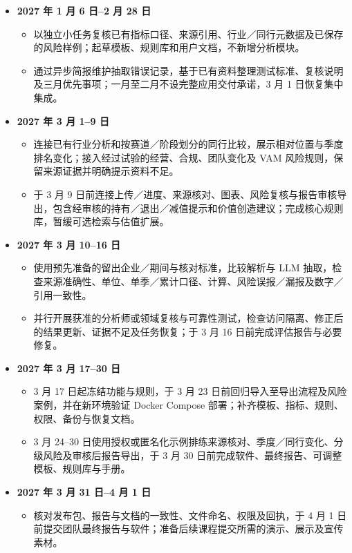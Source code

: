\documentclass[a4paper,12pt]{article}
\begin{document}
\begin{itemize}
  \item \textbf{2027 年 1 月 6 日--2 月 28 日}
    \begin{itemize}
      \item 以独立小任务复核已有指标口径、来源引用、行业／同行元数据及已保存的风险样例；起草模板、规则库和用户文档，不新增分析模块。
      \item 通过异步简报维护抽取错误记录，基于已有资料整理测试标准、复核说明及三月优先事项；一月至二月不设完整应用交付承诺，3 月 1 日恢复集中集成。
    \end{itemize}

  \item \textbf{2027 年 3 月 1--9 日}
    \begin{itemize}
      \item 连接已有行业分析和按赛道／阶段划分的同行比较，展示相对位置与季度排名变化；接入经过试验的经营、合规、团队变化及 VAM 风险规则，保留来源证据并明确提示资料不足。
      \item 于 3 月 9 日前连接上传／进度、来源核对、图表、风险复核与报告审核导出，包含经审核的持有／退出／减值提示和价值创造建议；完成核心规则库，暂缓可选检索与估值扩展。
    \end{itemize}

  \item \textbf{2027 年 3 月 10--16 日}
    \begin{itemize}
      \item 使用预先准备的留出企业／期间与核对标准，比较解析与 LLM 抽取，检查来源准确性、单位、单季／累计口径、计算、风险误报／漏报及数字／引用一致性。
      \item 并行开展获准的分析师或领域复核与可靠性测试，检查访问隔离、修正后的结果更新、证据不足及任务恢复；于 3 月 16 日前完成评估报告与必要修复。
    \end{itemize}

  \item \textbf{2027 年 3 月 17--30 日}
    \begin{itemize}
      \item 3 月 17 日起冻结功能与规则，于 3 月 23 日前回归导入至导出流程及风险案例，并在新环境验证 Docker Compose 部署；补齐模板、指标、规则、权限、备份与恢复文档。
      \item 3 月 24--30 日使用授权或匿名化示例排练来源核对、季度／同行变化、分级风险及审核后报告导出，于 3 月 30 日前完成软件、最终报告、可调整模板、规则库与手册。
    \end{itemize}

  \item \textbf{2027 年 3 月 31 日--4 月 1 日}
    \begin{itemize}
      \item 核对发布包、报告与文档的一致性、文件命名、权限及回执，于 4 月 1 日前提交团队最终报告与软件；准备后续课程提交所需的演示、展示及宣传素材。
    \end{itemize}

\end{itemize}
\end{document}
